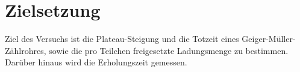 
\section{Zielsetzung}
\label{sec:Zielsetzung}

Ziel des Versuchs ist die Plateau-Steigung und die Totzeit eines Geiger-Müller-Zählrohres, sowie die pro Teilchen freigesetzte Ladungsmenge zu bestimmen. Darüber hinaus wird die Erholungszeit gemessen.

